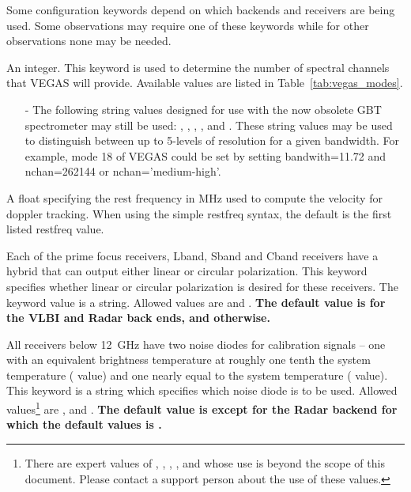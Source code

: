 Some configuration keywords depend on which backends and receivers are being
used.  Some observations may require one of these keywords while for other
observations none may be needed.

\begin{description}[font=\bfseries\large,leftmargin=*]

\item[nchan] An integer.  This keyword is used to determine the number of
spectral channels that \gls{VEGAS} will provide.  Available values are listed
in Table~\ref{tab:vegas_modes}.

\begin{itemize}
\item[-] The following string values designed for use with the now obsolete
\gls{GBT} spectrometer may still be used: , , ,
, and .  These string values may be used to distinguish
between up to 5-levels of resolution for a given bandwidth.  For example, mode
18 of \gls{VEGAS} could be set by setting bandwith=11.72 and nchan=262144 or
nchan='medium-high'.
\end{itemize}

\item[dopplertrackfreq] A float specifying the rest frequency in MHz used to
compute the velocity for doppler tracking.  When using the simple restfreq
syntax, the default is the first listed restfreq value.

\item[pol]  Each of the prime focus receivers, \gls{Lband}, \gls{Sband}
and \gls{Cband} receivers have a hybrid that can output either linear
or circular polarization. This keyword specifies whether linear or
circular polarization is desired for these receivers. The keyword value
is a string.  Allowed values are  and .
{\bf The default value is  for the \gls{VLBI}
and Radar back ends, and  otherwise.}

\item[noisecal]  All receivers below 12~GHz have two noise
diodes for calibration signals -- one with an equivalent brightness
temperature at roughly one tenth the system temperature ( value) and
one nearly equal to the system temperature ( value).  This keyword is
a string which specifies which noise diode is to be used.  Allowed
values\footnote{There are expert values of , , , 
,  and  whose use is beyond the scope of this
document.  Please contact a support person about the use of these values.}
are ,  and . {\bf The default value is  except
for the Radar backend for which the default values is .}


\end{description}
